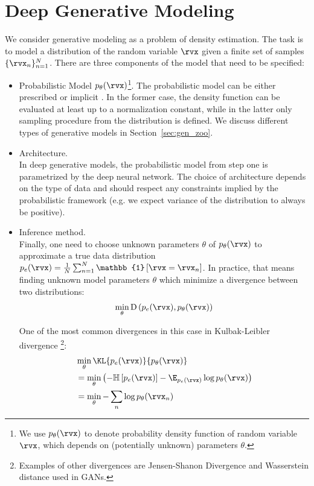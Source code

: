\section{Deep Generative Modeling}
We consider generative modeling as a problem of density estimation.  The task is to model a distribution of the random variable $\rvx$ given a finite set of samples $\{\rvx_n\}_{n=1}^N$. There are three components of the model that need to be specified:
\begin{itemize}
\item Probabilistic Model $p_{\theta}(\rvx)$\footnote{
	We use $p_{\theta}(\rvx)$ to denote probability density function of random variable $\rvx$, which depends on (potentially unknown) parameters $\theta$. 
}.\newline
The probabilistic model can be either prescribed or  implicit \citep{diggle1984monte}. In the former case, the density function can be evaluated at least up to a normalization constant, while in the latter only sampling procedure from the distribution is defined. We discuss different types of generative models in Section~\ref{sec:gen_zoo}.

\item Architecture.\\
In deep generative models, the probabilistic model from step one is parametrized by the deep neural network. The choice of architecture depends on the type of data and should respect any constraints implied by the probabilistic framework (e.g. we expect variance of the distribution to always be positive).

\item Inference method. \\
Finally, one need to choose unknown parameters $\theta$ of $p_{\theta}(\rvx)$ to approximate a true data distribution $p_e(\rvx)=\frac{1}{N} \sum_{n=1}^N \mathbb{1}\left[\rvx = \rvx_n\right]$. In practice, that means finding unknown model parameters $\theta$ which minimize a divergence between two distributions:
\begin{equation}
\begin{aligned}
\min_{\theta} \text{D}\left(p_{e}(\rvx), p_{\theta}(\rvx)\right) 
\end{aligned}
\end{equation}

One of the most common divergences in this case in Kulbak-Leibler divergence \footnote{Examples of other divergences are Jensen-Shanon Divergence and Wasserstein distance used in GANs.}:
\begin{equation}
\begin{aligned}
&\min_{\theta} \KL{p_{e}(\rvx)}{p_{\theta}(\rvx)} \\
& = \min_{\theta}  \left( - \mathbb{H}\left[p_{e}(\rvx)\right] - \E_{p_{e}(\rvx)}\log p_{\theta}(\rvx)\right)\\
& = \min_{\theta}  - \sum_{n}\log p_{\theta}(\rvx_n)\\
\end{aligned}
\end{equation}

\end{itemize}


